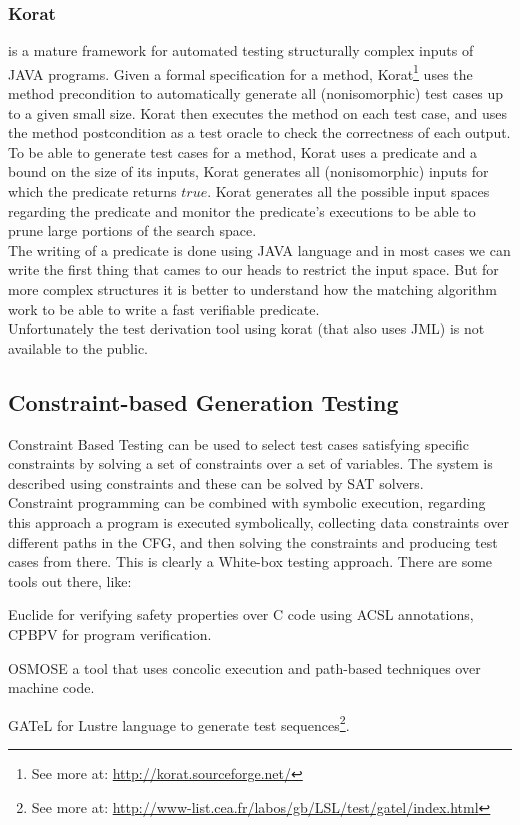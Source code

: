 \documentclass[10pt, conference, compsocconf]{IEEEtran}
\begin{document}
\subsubsection{\textbf{Korat}\cite{Boyapati02korat:automated}}
is a mature framework for automated testing structurally complex inputs of JAVA programs.
Given a formal specification for a method, Korat\footnote{See more at: \url{http://korat.sourceforge.net/}} uses the method precondition
to automatically generate all (nonisomorphic) test cases up to a given small size.
Korat then executes the method on each test case, and uses the method postcondition as a test oracle to check the correctness of each output.\\
To be able to generate test cases for a method, Korat uses a predicate and a bound on the size of its inputs,
Korat generates all (nonisomorphic) inputs for which the predicate returns $true$.
Korat generates all the possible input spaces regarding the predicate and monitor the predicate's executions to be able to prune large portions of the search space.\\
\indent The writing of a predicate is done using JAVA language and in most cases we can write the first thing that cames to our heads to restrict the input space.
But for more complex structures it is better to understand how the matching algorithm work to be able to write a fast verifiable predicate.\\
Unfortunately the test derivation tool using korat (that also uses JML) is not available to the public.

\subsection{Constraint-based Generation Testing}
Constraint Based Testing\cite{DeMillo91constraint-basedautomatic} can be used to select test cases satisfying specific constraints by
solving a set of constraints over a set of variables. The system is described using constraints and these can be solved by SAT solvers.\\
Constraint programming can be combined with symbolic execution, regarding this approach a program is executed symbolically,
collecting data constraints over different paths in the CFG, and then solving the constraints and producing test cases from there.
This is clearly a White-box testing approach.
There are some tools out there, like:

\begin{basedescript}{\desclabelstyle{\pushlabel}}
\item[Euclide] for verifying safety properties over C code using ACSL annotations, CPBPV for program verification.
\item[OSMOSE] a tool that uses concolic execution and path-based techniques over machine code.
\item[GATeL] for Lustre language to generate test sequences\footnote{See more at: \url{http://www-list.cea.fr/labos/gb/LSL/test/gatel/index.html}}.
\end{basedescript}
\end{document}
